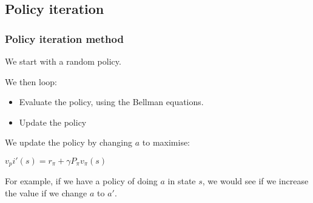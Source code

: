 
\subsection{Policy iteration}

\subsubsection{Policy iteration method}

We start with a random policy.

We then loop:

\begin{itemize}
\item Evaluate the policy, using the Bellman equations.
\item Update the policy
\end{itemize}

We update the policy by changing \(a\) to maximise:

\(v_pi ' (s)= r_\pi + \gamma P_\pi v_\pi(s)\) 

For example, if we have a policy of doing \(a\) in state \(s\), we would see if we increase the value if we change \(a\) to \(a'\).

